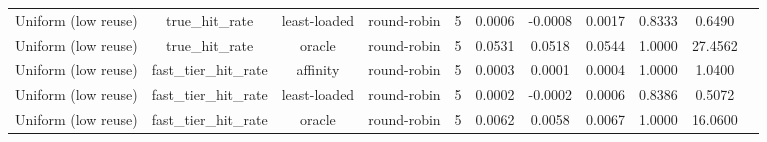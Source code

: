 \begin{table}[t]
\begin{tabular}{lcccccccccc}
Uniform (low reuse) & true\_hit\_rate & least-loaded & round-robin & 5 & 0.0006 & -0.0008 & 0.0017 & 0.8333 & 0.6490 \\
Uniform (low reuse) & true\_hit\_rate & oracle & round-robin & 5 & 0.0531 & 0.0518 & 0.0544 & 1.0000 & 27.4562 \\
Uniform (low reuse) & fast\_tier\_hit\_rate & affinity & round-robin & 5 & 0.0003 & 0.0001 & 0.0004 & 1.0000 & 1.0400 \\
Uniform (low reuse) & fast\_tier\_hit\_rate & least-loaded & round-robin & 5 & 0.0002 & -0.0002 & 0.0006 & 0.8386 & 0.5072 \\
Uniform (low reuse) & fast\_tier\_hit\_rate & oracle & round-robin & 5 & 0.0062 & 0.0058 & 0.0067 & 1.0000 & 16.0600 \\
\bottomrule
\end{tabular}
\end{table}
